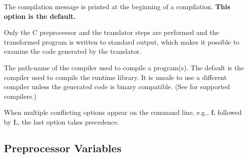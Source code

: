 \documentclass[openright,twoside]{report}
\begin{document}
\begin{prefix}
\item[\LGinlinetrue\LGbegin\lgrinde\L{\LB{\-\V{noquiet}}}\endlgrinde\LGend{}]
%
The \uC compilation message is printed at the beginning of a compilation.
\textbf{This option is the default.}

\item[\LGinlinetrue\LGbegin\lgrinde\L{\LB{\-\V{U}++}}\endlgrinde\LGend{}]
%
Only the C preprocessor and the \uC translator steps are performed and the transformed program is written to standard output, which makes it possible to examine the code generated by the \uC translator.

\item[\LGinlinetrue\LGbegin\lgrinde\L{\LB{\-\V{compiler}}}\endlgrinde\LGend{} path-name]
%
The path-name of the compiler used to compile a \uC program(s).
The default is the compiler used to compile the \uC runtime library.
It is unsafe to use a different compiler unless the generated code is binary compatible.
(See  for supported compilers.)
\end{prefix}
When multiple conflicting options appear on the command line, e.g., \LGinlinetrue\LGbegin\lgrinde\L{}\endlgrinde\LGend{} followed by \LGinlinetrue\LGbegin\lgrinde\L{}\endlgrinde\LGend{}, the last option takes precedence.


\subsection{Preprocessor Variables}
\label{s:PreprocessorVariables}
\end{document}
